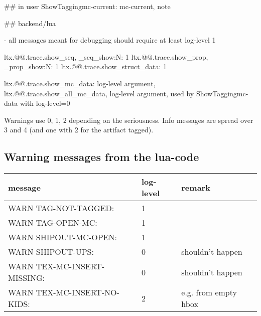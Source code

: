 



## in user
ShowTagging{mc-current}: mc-current, note


## backend/lua

- all messages meant for debugging should require at least log-level 1

ltx.@@.trace.show_seq,   \@@_seq_show:N: 1
ltx.@@.trace.show_prop,  \@@_prop_show:N: 1
ltx.@@.trace.show_struct_data: 1

ltx.@@.trace.show_mc_data:     log-level argument,
ltx.@@.trace.show_all_mc_data, log-level argument, 
used by ShowTagging{mc-data} with log-level=0

Warnings use 0, 1, 2 depending on the seriousness.
Info messages are spread over 3 and 4 (and one with 2 for the artifact tagged). 





\subsection{Warning messages from the lua-code}
\begin{tabular}{>{\ttfamily}lll}
message & log-level & remark \\\hline 
WARN TAG-NOT-TAGGED:       &1                   \\
WARN TAG-OPEN-MC:          &1                   \\
WARN SHIPOUT-MC-OPEN:      &1                    \\ 
WARN SHIPOUT-UPS:          &0 & shouldn't happen \\
WARN TEX-MC-INSERT-MISSING:&0 & shouldn't happen \\
WARN TEX-MC-INSERT-NO-KIDS:&2 & e.g. from empty hbox
\end{tabular}

